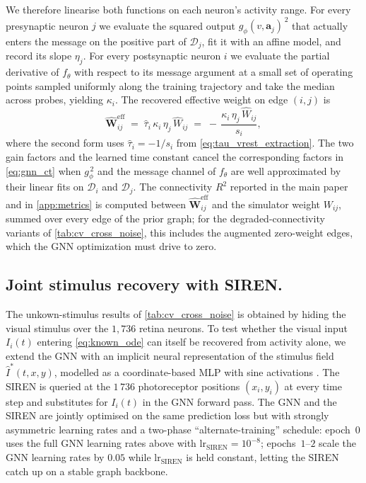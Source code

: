 \documentclass{article}
\begin{document}
We therefore linearise both functions on each neuron's activity
range. For every presynaptic neuron $j$ we evaluate the squared
output $g_\phi(v,\mathbf{a}_j)^{\,2}$ that actually enters the
message on the positive part of $\mathcal{D}_j$, fit it with an
affine model, and record its slope $\eta_j$. For every postsynaptic
neuron $i$ we evaluate the partial derivative of $f_\theta$ with
respect to its message argument at a small set of operating points
sampled uniformly along the training trajectory and take the
median across probes, yielding $\kappa_i$. The recovered effective
weight on edge $(i,j)$ is
\begin{equation}
    \hat{\mathbf{W}}^{\mathrm{eff}}_{ij}
    \;=\;
    \hat{\tau}_i\,\kappa_i\,\eta_j\,\hat{W}_{ij}
    \;=\;
    -\,\frac{\kappa_i\,\eta_j\,\hat{W}_{ij}}{s_i},
    \label{eq:weight_extraction}
\end{equation}
where the second form uses $\hat\tau_i = -1/s_i$ from
\cref{eq:tau_vrest_extraction}. The two gain factors and the
learned time constant cancel the corresponding factors in
\cref{eq:gnn_ct} when $g_\phi^{\,2}$ and the message channel of
$f_\theta$ are well approximated by their linear fits on
$\mathcal{D}_i$ and $\mathcal{D}_j$. The connectivity $R^2$
reported in the main paper and in \cref{app:metrics} is
computed between $\hat{\mathbf{W}}^{\mathrm{eff}}_{ij}$ and the simulator
weight $W_{ij}$, summed over every edge of the prior
graph; for the degraded-connectivity variants of
\cref{tab:cv_cross_noise}, this includes the augmented
zero-weight edges, which the GNN optimization must drive to zero.


\subsection{Joint stimulus recovery with SIREN.}
\label{app:SIREN}
The unkown-stimulus results of \cref{tab:cv_cross_noise} is obtained by hiding the visual stimulus over the $1{,}736$ retina neurons. To test whether the visual input $I_i(t)$ entering \cref{eq:known_ode} can itself be recovered from activity alone, we extend the GNN with an implicit neural representation of the stimulus field $\hat I^*(t,x,y)$, modelled as a coordinate-based
MLP with sine activations \citep[SIREN,][input size~$=3$,
hidden dimension~$=2048$, $4$ hidden layers, output size~$=1$,
$\omega_0\!=\!4096$, outermost-linear head]{sitzmann_implicit_2020}.
The SIREN is queried at the $1\,736$ photoreceptor positions
$(x_i,y_i)$ at every time step and substitutes for $I_i(t)$ in the
GNN forward pass. The GNN and the SIREN are jointly optimised on the
same prediction loss but with strongly asymmetric learning rates
and a two-phase ``alternate-training'' schedule: epoch~$0$ uses the
full GNN learning rates above with
$\text{lr}_\text{SIREN}\!=\!10^{-8}$; epochs~$1$–$2$ scale the GNN
learning rates by $0.05$ while $\text{lr}_\text{SIREN}$ is held
constant, letting the SIREN catch up on a stable graph backbone.
\end{document}
